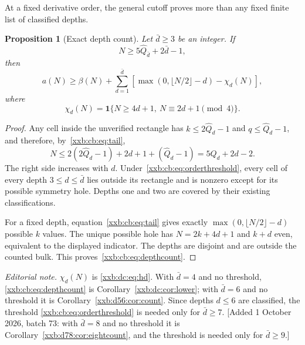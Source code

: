 \documentclass[11pt,a4paper]{article}
\numberwithin{equation}{section}
\newtheorem{proposition}[theorem]{Proposition}
\theoremstyle{definition}
\theoremstyle{remark}
\theoremstyle{plain}
\begin{document}
At a fixed derivative order, the general cutoff proves more than any fixed
finite list of classified depths.

\begin{proposition}[Exact depth count]\label{xxb:cb:prop:depthcount}
Let $\bar d\ge3$ be an integer. If
\begin{equation}\label{xxb:cb:eq:orderthreshold}
 N\ge5\widehat Q_{\bar d}+2\bar d-1,
\end{equation}
then
\begin{equation}\label{xxb:cb:eq:depthcount}
 a(N)\ge\beta(N)+\sum_{d=1}^{\bar d}
 \left[\max(0,\lfloor N/2\rfloor-d)-\chi_d(N)\right],
\end{equation}
where
\[
 \chi_d(N)=\mathbf1\{N\ge4d+1,\ N\equiv2d+1\pmod4\}.
\]
\end{proposition}
\begin{proof}
Any cell inside the unverified rectangle has $k\le2\widehat Q_d-1$ and
$q\le\widehat Q_d-1$, and therefore, by~\eqref{xxb:cb:eq:tail},
\[
 N\le2(2\widehat Q_d-1)+2d+1+(\widehat Q_d-1)=5\widehat Q_d+2d-2.
\]
The right side increases with $d$. Under~\eqref{xxb:cb:eq:orderthreshold},
every cell of every depth $3\le d\le\bar d$ lies outside its rectangle and is
nonzero except for its possible symmetry hole. Depths one and two are covered
by their existing classifications.

For a fixed depth, equation~\eqref{xxb:cb:eq:tail} gives exactly
$\max(0,\lfloor N/2\rfloor-d)$ possible $k$ values. The unique possible hole
has $N=2k+4d+1$ and $k+d$ even, equivalent to the displayed indicator. The
depths are disjoint and are outside the counted bulk. This
proves~\eqref{xxb:cb:eq:depthcount}.
\end{proof}

\emph{Editorial note.}  $\chi_d(N)$ is \eqref{xxb:dc:eq:hd}.  With
$\bar d=4$ and no threshold, \eqref{xxb:cb:eq:depthcount} is
Corollary~\ref{xxb:dc:cor:lower}; with $\bar d=6$ and no threshold it is
Corollary~\ref{xxb:d56:cor:count}.  Since depths $d\le6$ are classified, the
threshold \eqref{xxb:cb:eq:orderthreshold} is needed only for $\bar d\ge7$.
[Added 1 October 2026, batch 73: with $\bar d=8$ and no threshold it is
Corollary~\ref{xxb:d78:cor:eightcount}, and the threshold is needed only for
$\bar d\ge9$.]
\end{document}
